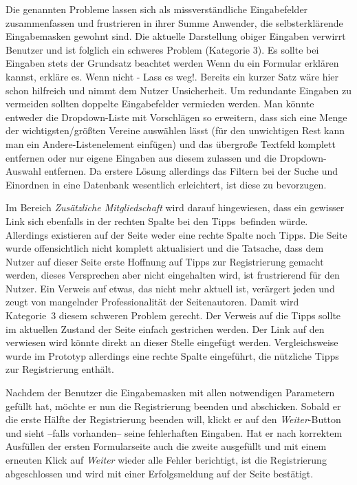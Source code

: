 {Die genannten Probleme lassen sich als missverständliche Eingabefelder zusammenfassen und frustrieren in ihrer Summe Anwender, die selbsterklärende Eingabemasken gewohnt sind. Die aktuelle Darstellung obiger Eingaben verwirrt Benutzer und ist folglich ein schweres Problem (Kategorie 3).
}{
Es sollte bei Eingaben stets der Grundsatz beachtet werden \glqq Wenn du ein Formular erklären kannst, erkläre es. Wenn nicht - Lass es weg!\grqq. Bereits ein kurzer Satz wäre hier schon hilfreich und nimmt dem Nutzer Unsicherheit. Um re\-dun\-dan\-te Eingaben zu vermeiden sollten doppelte Eingabefelder vermieden werden. Man könnte entweder die Dropdown-Liste mit Vorschlägen so erweitern, dass sich eine Menge der wichtigsten/größten Vereine auswählen lässt (für den unwichtigen Rest kann man ein \glqq Andere\grqq-Listenelement einfügen) und das übergroße Textfeld komplett entfernen oder nur eigene Eingaben aus diesem zulassen und die Dropdown-Auswahl entfernen. Da erstere Lösung allerdings das Filtern bei der Suche und Einordnen in eine Datenbank wesentlich erleichtert, ist diese zu bevorzugen.}
\label{prob:reg:unclearinput}


{Im Bereich \emph{Zusätzliche Mitgliedschaft} wird darauf hingewiesen, dass ein gewisser Link sich ebenfalls in der \glqq rechten Spalte bei den Tipps\grqq ~befinden würde. Allerdings existieren auf der Seite weder eine rechte Spalte noch Tipps. Die Seite wurde offensichtlich nicht komplett aktualisiert und die Tatsache, dass dem Nutzer auf dieser Seite erste Hoffnung auf Tipps zur Registrierung gemacht werden, dieses Versprechen aber nicht eingehalten wird, ist frustrierend für den Nutzer.
}
{Ein Verweis auf etwas, das nicht mehr aktuell ist, verärgert jeden und zeugt von mangelnder Professionalität der Seitenautoren. Damit wird Kategorie~3 diesem schweren Problem gerecht.
}
{Der Verweis auf die Tipps sollte im aktuellen Zustand der Seite einfach gestrichen werden. Der Link auf den verwiesen wird könnte direkt an dieser Stelle eingefügt werden. Vergleichsweise wurde im Prototyp allerdings eine rechte Spalte eingeführt, die nützliche Tipps zur Registrierung enthält.
} 
\label{prob:reg:missingtipps}


Nachdem der Benutzer die Eingabemasken mit allen notwendigen Parametern gefüllt hat, möchte er nun die Registrierung beenden und abschicken. Sobald
er die erste Hälfte der Registrierung beenden will, klickt er auf den \emph{Weiter}-Button und sieht --falls vorhanden-- seine fehlerhaften Eingaben. Hat er nach korrektem
Ausfüllen der ersten Formularseite auch die zweite ausgefüllt und mit einem erneuten Klick auf \emph{Weiter} wieder alle Fehler berichtigt, ist die Registrierung abgeschlossen und wird mit einer Erfolgsmeldung auf der Seite bestätigt.

